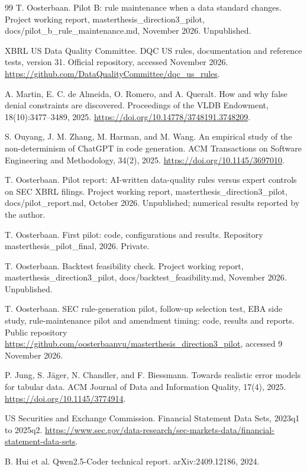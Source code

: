 \documentclass[11pt,a4paper]{article}
\begin{document}
\begin{thebibliography}{99}
 T. Oosterbaan. Pilot B: rule maintenance when a data standard changes. Project working report, masterthesis\_direction3\_pilot, docs/pilot\_b\_rule\_maintenance.md, November 2026. Unpublished.

 XBRL US Data Quality Committee. DQC US rules, documentation and reference tests, version 31. Official repository, accessed November 2026. \url{https://github.com/DataQualityCommittee/dqc_us_rules}.

 A. Martin, E. C. de Almeida, O. Romero, and A. Queralt. How and why false denial constraints are discovered. Proceedings of the VLDB Endowment, 18(10):3477--3489, 2025. \url{https://doi.org/10.14778/3748191.3748209}.

 S. Ouyang, J. M. Zhang, M. Harman, and M. Wang. An empirical study of the non-determinism of ChatGPT in code generation. ACM Transactions on Software Engineering and Methodology, 34(2), 2025. \url{https://doi.org/10.1145/3697010}.

 T. Oosterbaan. Pilot report: AI-written data-quality rules versus expert controls on SEC XBRL filings. Project working report, masterthesis\_direction3\_pilot, docs/pilot\_report.md, October 2026. Unpublished; numerical results reported by the author.

 T. Oosterbaan. First pilot: code, configurations and results. Repository masterthesis\_pilot\_final, 2026. Private.

 T. Oosterbaan. Backtest feasibility check. Project working report, masterthesis\_direction3\_pilot, docs/backtest\_feasibility.md, November 2026. Unpublished.

 T. Oosterbaan. SEC rule-generation pilot, follow-up selection test, EBA side study, rule-maintenance pilot and amendment timing: code, results and reports. Public repository \url{https://github.com/oosterbaanvu/masterthesis_direction3_pilot}, accessed 9 November 2026.

 P. Jung, S. J\"ager, N. Chandler, and F. Biessmann. Towards realistic error models for tabular data. ACM Journal of Data and Information Quality, 17(4), 2025. \url{https://doi.org/10.1145/3774914}.

 US Securities and Exchange Commission. Financial Statement Data Sets, 2023q1 to 2025q2. \url{https://www.sec.gov/data-research/sec-markets-data/financial-statement-data-sets}.

 B. Hui et al. Qwen2.5-Coder technical report. arXiv:2409.12186, 2024.


\end{thebibliography}
\end{document}
